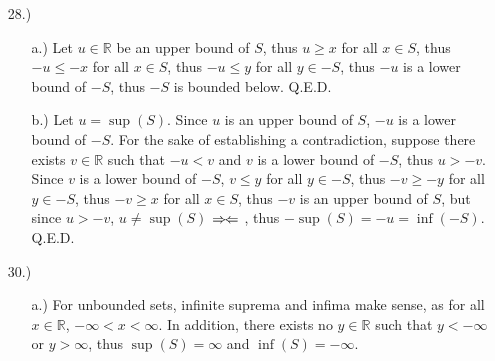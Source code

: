 \documentclass[12pt]{article}
\newcommand{\contradiction}{
    \ensuremath{{\Rightarrow\mspace{-2mu}\Leftarrow}}
}
\begin{document}
\pagestyle{fancy}
\fancyhead{}

\normalsize
\begin{itemize}



    \item [28.)] \begin{itemize}
        \item [a.)] Let $u\in\mathbb{R}$ be an upper bound of $S$, thus $u\geq x$ for all $x\in S$, thus $-u\leq-x$ for all $x\in S$, thus $-u\leq y$ for all $y\in-S$, thus $-u$ is a lower bound of $-S$, thus $-S$ is bounded below. Q.E.D.

        \item [b.)] Let $u=\sup(S)$. Since $u$ is an upper bound of $S$, $-u$ is a lower bound of $-S$. For the sake of establishing a contradiction, suppose there exists $v\in\mathbb{R}$ such that $-u<v$ and $v$ is a lower bound of $-S$, thus $u>-v$. Since $v$ is a lower bound of $-S$, $v\leq y$ for all $y\in-S$, thus $-v\geq-y$ for all $y\in-S$, thus $-v\geq x$ for all $x\in S$, thus $-v$ is an upper bound of $S$, but since $u>-v$, $u\neq\sup(S)$\contradiction, thus $-\sup(S)=-u=\inf(-S)$. Q.E.D.
    \end{itemize}




    \item [30.)] \begin{itemize}
        \item [a.)] For unbounded sets, infinite suprema and infima make sense, as for all $x\in\mathbb{R}$, $-\infty<x<\infty$. In addition, there exists no $y\in\mathbb{R}$ such that $y<-\infty$ or $y>\infty$, thus $\sup(S)=\infty$ and $\inf(S)=-\infty$.


\end{itemize}
\end{itemize}
\end{document}
